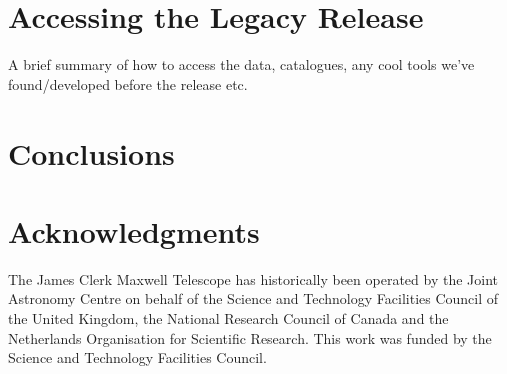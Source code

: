 \documentclass[usenatbib]{mn2e}
\begin{document}
\section{Accessing the Legacy Release}
A brief summary of how to access the data, catalogues, any cool tools
we've found/developed before the release etc.

\section{Conclusions}

\section*{Acknowledgments}

The James Clerk Maxwell Telescope has historically been operated by
the Joint Astronomy Centre on behalf of the Science and Technology
Facilities Council of the United Kingdom, the National Research
Council of Canada and the Netherlands Organisation for Scientific
Research. This work was funded by the Science and Technology Facilities
Council.



\end{document}
